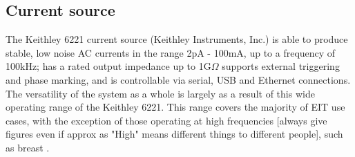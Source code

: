 \subsection{Current source}

The Keithley 6221 current source (Keithley Instruments, Inc.) is able to produce stable, low noise AC currents in the range 2pA - 100mA, up to a frequency of 100kHz; has a rated output impedance up to 1G\(\Omega\) supports external triggering and phase marking, and is controllable via serial, USB and Ethernet connections. The versatility of the system as a whole is largely as a result of this wide operating range of the Keithley 6221. This range covers the majority of EIT use cases, with the exception of those operating at high frequencies [always give figures even if approx as "High" means different things to different people], such as breast \cite{khan}. 